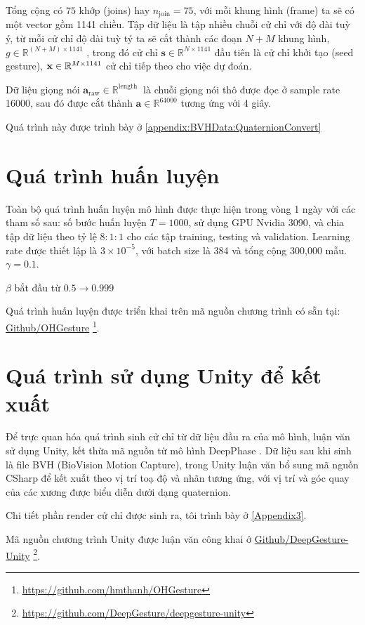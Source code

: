 Tổng cộng có $75$ khớp (joins) hay $n_{\text{join}} = 75$, với mỗi khung hình (frame) ta sẽ có một vector gồm 1141 chiều.
Tập dữ liệu là tập nhiều chuỗi cử chỉ với độ dài tuỳ ý, từ mỗi cử chỉ độ dài tuỳ tý ta sẽ cắt thành các đoạn $N + M$ khung hình, $g \in \mathbb{R}^{(N + M) \times 1141}$ , trong đó cử chỉ $\mathbf{s} \in \mathbb{R}^{N \times 1141}$ đầu tiên là cử chỉ khởi tạo (seed gesture), $\mathbf{x} \in \mathbb{R}^{M \times 1141}$ cử chỉ tiếp theo cho việc dự đoán.


Dữ liệu giọng nói $\mathbf{a}_{\text{raw}} \in \mathbb{R}^{ \text{length } }$ là chuỗi giọng nói thô được đọc ở sample rate 16000, sau đó được cắt thành $\mathbf{a} \in \mathbb{R}^{64000}$ tương ứng với 4 giây.

Quá trình này được trình bày ở \autoref{appendix:BVHData:QuaternionConvert}



\section{Quá trình huấn luyện}

Toàn bộ quá trình huấn luyện mô hình được thực hiện trong vòng 1 ngày với các tham số sau: số bước huấn luyện $T = 1000$, sử dụng GPU Nvidia 3090, và chia tập dữ liệu theo tỷ lệ $8:1:1$ cho các tập training, testing và validation. Learning rate được thiết lập là $3 \times 10^{-5}$, với batch size là 384 và tổng cộng 300,000 mẫu. 
$\gamma = 0.1$.

$\beta$ bắt đầu từ $0.5 \rightarrow 0.999$

Quá trình huấn luyện được triển khai trên mã nguồn chương trình có sẵn tại: \hyperlink{https://github.com/hmthanh/OHGesture}{Github/OHGesture} \footnote{\url{https://github.com/hmthanh/OHGesture}}.




\section{Quá trình sử dụng Unity để kết xuất}

Để trực quan hóa quá trình sinh cử chỉ từ dữ liệu đầu ra của mô hình, luận văn sử dụng Unity, kết thừa mã nguồn từ mô hình DeepPhase \cite{starke2022deepphase}  . Dữ liệu sau khi sinh là file BVH (BioVision Motion Capture), trong Unity luận văn bổ sung mã nguồn CSharp để kết xuất theo vị trí toạ độ và nhãn tương ứng, với vị trí và góc quay của các xương được biểu diễn dưới dạng quaternion.

Chi tiết phần render cử chỉ được sinh ra, tôi trình bày ở \autoref{Appendix3}.

Mã nguồn chương trình Unity được luận văn công khai ở \hyperlink{https://github.com/DeepGesture/deepgesture-unity}{Github/DeepGesture-Unity}
\footnote{\url{https://github.com/DeepGesture/deepgesture-unity}}.
